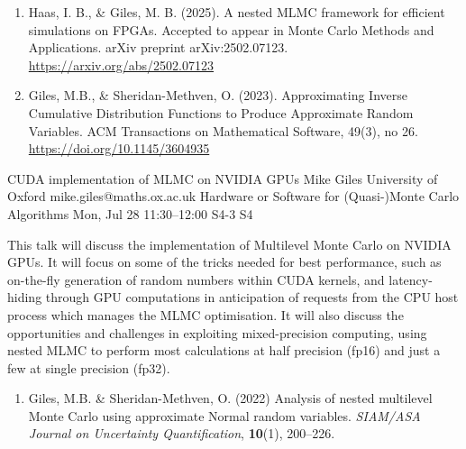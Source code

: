 \documentclass[12pt,lettersize,oneside]{book} %
\begin{document}
\begin{talk}
\begin{enumerate}
    \item[{[2]}] Haas, I. B., \& Giles, M. B. (2025). A nested MLMC framework for efficient simulations on FPGAs. Accepted to appear in Monte Carlo Methods and Applications. arXiv preprint arXiv:2502.07123. \url{https://arxiv.org/abs/2502.07123}

     \item[{[3]}] Giles, M.B., \& Sheridan-Methven, O. (2023). Approximating Inverse Cumulative Distribution Functions to Produce Approximate Random Variables. ACM Transactions on Mathematical Software, 49(3), no 26. \url{https://doi.org/10.1145/3604935}
\end{enumerate}

\end{talk}

\begin{talk}
  {CUDA implementation of MLMC on NVIDIA GPUs}%
  {Mike Giles}%
  {University of Oxford}%
  {mike.giles@maths.ox.ac.uk}%
  {Hardware or Software for (Quasi-)Monte Carlo Algorithms}%
  {}%
  {Mon, Jul 28 11:30--12:00}%
  {S4-3}%
  {S4}%
    
   

This talk will discuss the implementation of Multilevel Monte Carlo
on NVIDIA GPUs.  It will focus on some of the tricks needed for best
performance, such as on-the-fly generation of random numbers within
CUDA kernels, and latency-hiding through GPU computations in anticipation
of requests from the CPU host process which manages the MLMC optimisation.
It will also discuss the opportunities and challenges in exploiting
mixed-precision computing, using nested MLMC to perform most calculations
at half precision (fp16) and just a few at single precision (fp32).

\medskip

\begin{enumerate}
\item[{[1]}] Giles, M.B. \& Sheridan-Methven, O. (2022)
  Analysis of nested multilevel Monte Carlo using approximate
  Normal random variables. {\it SIAM/ASA
Journal on Uncertainty Quantification}, \textbf{10}(1), 200--226.
\end{enumerate}

\end{talk}
\end{document}
